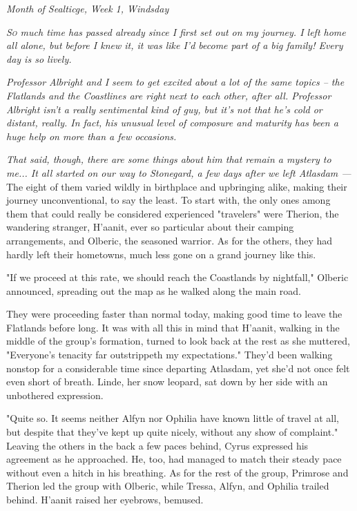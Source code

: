 \begin{flushright}\emph{Month of Sealticge, Week 1, Windsday}\end{flushright}


\emph{\textsc{So} much time has passed already since I first set out on my journey. I left home all alone, but before I knew it, it was like I'd become part of a big family! Every day is so lively.}

\emph{Professor Albright and I seem to get excited about a lot of the same topics -- the Flatlands and the Coastlines are right next to each other, after all. Professor Albright isn't a really sentimental kind of guy, but it's not that he's cold or distant, really. In fact, his unusual level of composure and maturity has been a huge help on more than a few occasions.}

\emph{That said, though, there are some things about him that remain a mystery to me... It all started on our way to Stonegard, a few days after we left Atlasdam ---} 
\\

 The eight of them varied wildly in birthplace and upbringing alike, making their journey unconventional, to say the least. To start with, the only ones among them that could really be considered experienced "travelers" were Therion, the wandering stranger, H'aanit, ever so particular about their camping arrangements, and Olberic, the seasoned warrior. As for the others, they had hardly left their hometowns, much less gone on a grand journey like this. 

"If we proceed at this rate, we should reach the Coastlands by nightfall," Olberic announced, spreading out the map as he walked along the main road.

They were proceeding faster than normal today, making good time to leave the Flatlands before long. It was with all this in mind that H'aanit, walking in the middle of the group's formation, turned to look back at the rest as she muttered, "Everyone's tenacity far outstrippeth my expectations." They'd been walking nonstop for a considerable time since departing Atlasdam, yet she'd not once felt even short of breath. Linde, her snow leopard, sat down by her side with an unbothered expression.

"Quite so. It seems neither Alfyn nor Ophilia have known little of travel at all, but despite that they've kept up quite nicely, without any show of complaint." Leaving the others in the back a few paces behind, Cyrus expressed his agreement as he approached. He, too, had managed to match their steady pace without even a hitch in his breathing. As for the rest of the group, Primrose and Therion led the group with Olberic, while Tressa, Alfyn, and Ophilia trailed behind. H'aanit raised her eyebrows, bemused.

